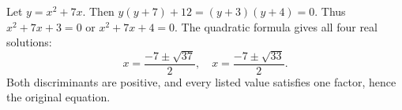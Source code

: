 Let $y=x^2+7x$. Then $y(y+7)+12=(y+3)(y+4)=0$. Thus $x^2+7x+3=0$ or $x^2+7x+4=0$. The quadratic formula gives all four real solutions:\[\boxed{x=\dfrac{-7\pm\sqrt{37}}{2},\quad x=\dfrac{-7\pm\sqrt{33}}{2}}.\]Both discriminants are positive, and every listed value satisfies one factor, hence the original equation.
